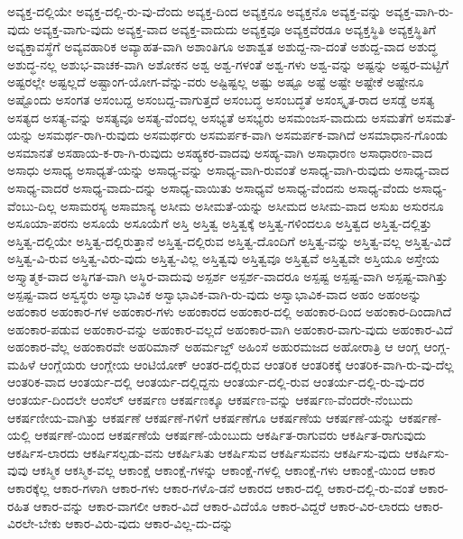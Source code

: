{ಅವ್ಯಕ್ತ-ದಲ್ಲಿಯೇ
ಅವ್ಯಕ್ತ-ದಲ್ಲಿ-ರು-ವು-ದೆಂದು
ಅವ್ಯಕ್ತ-ದಿಂದ
ಅವ್ಯಕ್ತನೂ
ಅವ್ಯಕ್ತನೊ
ಅವ್ಯಕ್ತ-ವನ್ನು
ಅವ್ಯಕ್ತ-ವಾಗಿ-ರು-ವುದು
ಅವ್ಯಕ್ತ-ವಾಗು-ವುದು
ಅವ್ಯಕ್ತ-ವಾದ
ಅವ್ಯಕ್ತ-ವಾದುದು
ಅವ್ಯಕ್ತವೂ
ಅವ್ಯಕ್ತವೆರಡೂ
ಅವ್ಯಕ್ತಸ್ಥಿತಿ
ಅವ್ಯಕ್ತಸ್ಥಿತಿಗೆ
ಅವ್ಯಕ್ತಾವಸ್ಥೆಗೆ
ಅವ್ಯವಹಾರಿಕ
ಅವ್ಯಾಹತ-ವಾಗಿ
ಅಶಾಂತಿಗೂ
ಅಶಾಶ್ವತ
ಅಶುದ್ದ-ನಾ-ದಂತೆ
ಅಶುದ್ದ-ವಾದ
ಅಶುದ್ಧ
ಅಶುದ್ಧ-ನಲ್ಲ
ಅಶುಭ-ವಾಚಕ-ವಾಗಿ
ಅಶೋಕನ
ಅಶ್ವ
ಅಶ್ವ-ಗಳಂತೆ
ಅಶ್ವ-ಗಳು
ಅಶ್ವ-ವನ್ನು
ಅಷ್ಟನ್ನು
ಅಷ್ಟರ-ಮಟ್ಟಿಗೆ
ಅಷ್ಟರಲ್ಲೇ
ಅಷ್ಟಲ್ಲದೆ
ಅಷ್ಟಾಂಗ-ಯೋಗ-ವೆನ್ನು-ವರು
ಅಷ್ಟಿಷ್ಟಲ್ಲ
ಅಷ್ಟು
ಅಷ್ಟೂ
ಅಷ್ಟೆ
ಅಷ್ಟೇ
ಅಷ್ಟೇಕೆ
ಅಷ್ಟೇನೂ
ಅಷ್ಟೊಂದು
ಅಸಂಗತ
ಅಸಂಬದ್ದ
ಅಸಂಬದ್ದ-ವಾಗುತ್ತದೆ
ಅಸಂಬದ್ಧ
ಅಸಂಬದ್ಧತೆ
ಅಸಂಸ್ಕೃತ-ರಾದ
ಅಸಡ್ಡೆ
ಅಸತ್ಯ
ಅಸತ್ಯದ
ಅಸತ್ಯ-ವನ್ನು
ಅಸತ್ಯವೂ
ಅಸತ್ಯ-ವೆಂದಲ್ಲ
ಅಸಭ್ಯತೆ
ಅಸಭ್ಯರು
ಅಸಮಂಜಸ-ವಾದುದು
ಅಸಮತೆಗೆ
ಅಸಮತೆ-ಯನ್ನು
ಅಸಮರ್ಥ-ರಾಗಿ-ರುವುದು
ಅಸಮರ್ಥರು
ಅಸಮರ್ಪಕ-ವಾಗಿ
ಅಸಮರ್ಪಕ-ವಾಗಿದೆ
ಅಸಮಾಧಾನ-ಗೊಂಡು
ಅಸಮಾನತೆ
ಅಸಹಾಯ-ಕ-ರಾ-ಗಿ-ರುವುದು
ಅಸಹ್ಯಕರ-ವಾದವು
ಅಸಹ್ಯ-ವಾಗಿ
ಅಸಾಧಾರಣ
ಅಸಾಧಾರಣ-ವಾದ
ಅಸಾಧು
ಅಸಾಧ್ಯ
ಅಸಾಧ್ಯತೆ-ಯನ್ನು
ಅಸಾಧ್ಯ-ವನ್ನು
ಅಸಾಧ್ಯ-ವಾಗಿ-ರುವಂತೆ
ಅಸಾಧ್ಯ-ವಾಗಿ-ರುವುದು
ಅಸಾಧ್ಯ-ವಾದ
ಅಸಾಧ್ಯ-ವಾದರೆ
ಅಸಾಧ್ಯ-ವಾದು-ದನ್ನು
ಅಸಾಧ್ಯ-ವಾಯಿತು
ಅಸಾಧ್ಯವೆ
ಅಸಾಧ್ಯ-ವೆಂದನು
ಅಸಾಧ್ಯ-ವೆಂದು
ಅಸಾಧ್ಯ-ವೆಂಬು-ದಿಲ್ಲ
ಅಸಾಮರಸ್ಯ
ಅಸಾಮಾನ್ಯ
ಅಸೀಮ
ಅಸೀಮತೆ-ಯನ್ನು
ಅಸೀಮದ
ಅಸೀಮ-ವಾದ
ಅಸುಖ
ಅಸುರನೂ
ಅಸೂಯಾ-ಪರನು
ಅಸೂಯೆ
ಅಸೂಯೆಗೆ
ಅಸ್ತಿ
ಅಸ್ತಿತ್ವ
ಅಸ್ತಿತ್ವಕ್ಕೆ
ಅಸ್ತಿತ್ವ-ಗಳಿಂದಲೂ
ಅಸ್ತಿತ್ವದ
ಅಸ್ತಿತ್ವ-ದಲ್ಲಿತ್ತು
ಅಸ್ತಿತ್ವ-ದಲ್ಲಿಯೇ
ಅಸ್ತಿತ್ವ-ದಲ್ಲಿರುತ್ತಾನೆ
ಅಸ್ತಿತ್ವ-ದಲ್ಲಿರುವ
ಅಸ್ತಿತ್ವ-ದೊಂದಿಗೆ
ಅಸ್ತಿತ್ವ-ವನ್ನು
ಅಸ್ತಿತ್ವ-ವಲ್ಲ
ಅಸ್ತಿತ್ವ-ವಿದೆ
ಅಸ್ತಿತ್ವ-ವಿ-ರುವ
ಅಸ್ತಿತ್ವ-ವಿರು-ವುದು
ಅಸ್ತಿತ್ವ-ವಿಲ್ಲ
ಅಸ್ತಿತ್ವವು
ಅಸ್ತಿತ್ವವೂ
ಅಸ್ತಿತ್ವವೆ
ಅಸ್ತಿತ್ವವೇ
ಅಸ್ತಿಯೂ
ಅಸ್ತೇಯ
ಅಸ್ತ್ಯಾತ್ಮಕ-ವಾದ
ಅಸ್ಥಿಗತ-ವಾಗಿ
ಅಸ್ಥಿರ-ವಾದುವು
ಅಸ್ಪರ್ಶ
ಅಸ್ಪರ್ಶ-ವಾದರೂ
ಅಸ್ಪಷ್ಟ
ಅಸ್ಪಷ್ಟ-ವಾಗಿ
ಅಸ್ಪಷ್ಟ-ವಾಗಿತ್ತು
ಅಸ್ಪಷ್ಟ-ವಾದ
ಅಸ್ವಸ್ಥರು
ಅಸ್ವಾಭಾವಿಕ
ಅಸ್ವಾಭಾವಿಕ-ವಾಗಿ-ರು-ವುದು
ಅಸ್ವಾಭಾವಿಕ-ವಾದ
ಅಹಂ
ಅಹಂಅನ್ನು
ಅಹಂಕಾರ
ಅಹಂಕಾರ-ಗಳ
ಅಹಂಕಾರ-ಗಳು
ಅಹಂಕಾರದ
ಅಹಂಕಾರ-ದಲ್ಲಿ
ಅಹಂಕಾರ-ದಿಂದ
ಅಹಂಕಾರ-ದಿಂದಾಗಿದೆ
ಅಹಂಕಾರ-ಪಡುವ
ಅಹಂಕಾರ-ವನ್ನು
ಅಹಂಕಾರ-ವಲ್ಲದೆ
ಅಹಂಕಾರ-ವಾಗಿ
ಅಹಂಕಾರ-ವಾಗು-ವುದು
ಅಹಂಕಾರ-ವಿದೆ
ಅಹಂಕಾರ-ವೆಲ್ಲ
ಅಹಂಕಾರವೇ
ಅಹರಿಮಾನ್
ಅಹರ್ಮಜ್ದ್
ಅಹಿಂಸೆ
ಅಹುರಮಜದ
ಅಹೋರಾತ್ರಿ
ಆ
ಆಂಗ್ಲ
ಆಂಗ್ಲ-ಮಹಿಳೆ
ಆಂಗ್ಲೆಯರು
ಆಂಗ್ಲೇಯ
ಆಂಟಿಯೋಕ್
ಆಂತರ-ದಲ್ಲಿರುವ
ಆಂತರಿಕ
ಆಂತರಿಕಕ್ಕೆ
ಆಂತರಿಕ-ವಾಗಿ-ರು-ವು-ದೆಲ್ಲ
ಆಂತರಿಕ-ವಾದ
ಆಂತರ್ಯ-ದಲ್ಲಿ
ಆಂತರ್ಯ-ದಲ್ಲಿದ್ದನು
ಆಂತರ್ಯ-ದಲ್ಲಿ-ರುವ
ಆಂತರ್ಯ-ದಲ್ಲಿ-ರು-ವು-ದರ
ಆಂತರ್ಯ-ದಿಂದಲೇ
ಆಂಸೆಲ್
ಆಕರ್ಷಣ
ಆಕರ್ಷಣಕ್ಕೂ
ಆಕರ್ಷಣ-ವನ್ನು
ಆಕರ್ಷಣ-ವೆಂದರೇ-ನೆಂಬುದು
ಆಕರ್ಷಣೀಯ-ವಾಗಿತ್ತು
ಆಕರ್ಷಣೆ
ಆಕರ್ಷಣೆ-ಗಳಿಗೆ
ಆಕರ್ಷಣೆಗೂ
ಆಕರ್ಷಣೆಯ
ಆಕರ್ಷಣೆ-ಯನ್ನು
ಆಕರ್ಷಣೆ-ಯಲ್ಲಿ
ಆಕರ್ಷಣೆ-ಯಿಂದ
ಆಕರ್ಷಣೆಯೆ
ಆಕರ್ಷಣೆ-ಯೆಂಬುದು
ಆಕರ್ಷಿತ-ರಾಗುವರು
ಆಕರ್ಷಿತ-ರಾಗುವುದು
ಆಕರ್ಷಿಸ-ಲಾರದು
ಆಕರ್ಷಿಸಲ್ಪಡು-ವನು
ಆಕರ್ಷಿಸಿತು
ಆಕರ್ಷಿಸುವ
ಆಕರ್ಷಿಸುವನು
ಆಕರ್ಷಿಸು-ವುದು
ಆಕರ್ಷಿಸು-ವುವು
ಆಕಸ್ಮಿಕ
ಆಕಸ್ಮಿಕ-ವಲ್ಲ
ಆಕಾಂಕ್ಷೆ
ಆಕಾಂಕ್ಷೆ-ಗಳನ್ನು
ಆಕಾಂಕ್ಷೆ-ಗಳಲ್ಲಿ
ಆಕಾಂಕ್ಷೆ-ಗಳು
ಆಕಾಂಕ್ಷೆ-ಯಿಂದ
ಆಕಾರ
ಆಕಾರಕ್ಕೆಲ್ಲ
ಆಕಾರ-ಗಳಾಗಿ
ಆಕಾರ-ಗಳು
ಆಕಾರ-ಗಳೊ-ಡನೆ
ಆಕಾರದ
ಆಕಾರ-ದಲ್ಲಿ
ಆಕಾರ-ದಲ್ಲಿ-ರು-ವಂತೆ
ಆಕಾರ-ರಹಿತ
ಆಕಾರ-ವನ್ನು
ಆಕಾರ-ವಾಗಲೀ
ಆಕಾರ-ವಿದೆ
ಆಕಾರ-ವಿದೆಯೊ
ಆಕಾರ-ವಿದ್ದರೆ
ಆಕಾರ-ವಿರ-ಲಾರದು
ಆಕಾರ-ವಿರಲೇ-ಬೇಕು
ಆಕಾರ-ವಿರು-ವುದು
ಆಕಾರ-ವಿಲ್ಲ-ದು-ದನ್ನು
}
